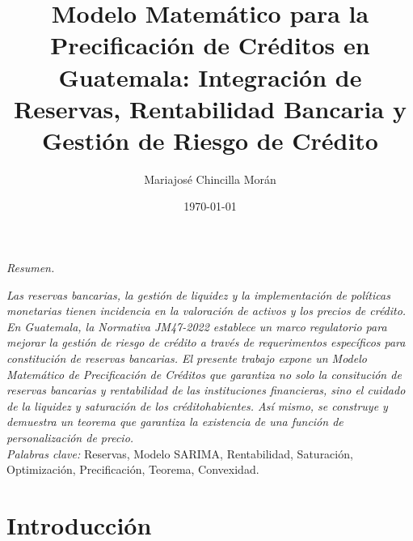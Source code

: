 \documentclass[12pt]{article} %
\title{Modelo Matemático para la Precificación de Créditos en Guatemala: Integración de Reservas, Rentabilidad Bancaria y Gestión de Riesgo de Crédito}
\author{Mariajosé Chincilla Morán}
\date{\today}
\begin{document}
\maketitle
\begin{center}
\textit{Resumen.}    
\end{center}
\textit{Las reservas bancarias, la gestión de liquidez y la implementación de políticas monetarias tienen incidencia en la valoración de activos y los precios de crédito. En Guatemala, la Normativa JM47-2022 establece un marco regulatorio para mejorar la gestión de riesgo de crédito a través de requerimentos específicos para constitución de reservas bancarias. El presente trabajo expone un Modelo Matemático de Precificación de Créditos que garantiza no solo la consitución de reservas bancarias y rentabilidad de las instituciones financieras, sino el cuidado de la liquidez y saturación de los créditohabientes. Así mismo, se construye y demuestra un teorema que garantiza la existencia de una función de personalización de precio. } \\
\textit{Palabras clave:} Reservas, Modelo SARIMA, Rentabilidad, Saturación, Optimización, Precificación, Teorema, Convexidad.
\tableofcontents
\listoffigures
\printindex
\section{Introducción}

\newpage



\newpage


\end{document}
